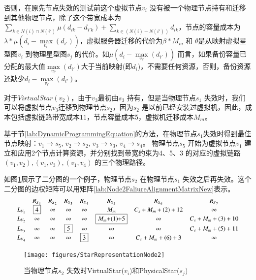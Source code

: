 否则，在原先节点失效的测试前这个虚拟节点$v_i$ 没有被一个物理节点持有和迁移到其他物理节点，除了这个带宽成本为${\sum\limits_{k \in N(i) \cap N(i')} {\mu({d_{ik}} - {d_{i'k}})}  + \sum\limits_{k \in \left( {N(i) - N(i')} \right)} {{d_{ik}}} }$，节点的容量成本为${\lambda * \mu({d_i} - \mathop {\max }\limits_{{v_{i'}}} \left( {{d_{i'}}} \right))}$，虚拟服务器迁移的代价为${\beta * {M_m}}$ 和 $\theta$是从映射虚拟星型图$v_i$ 到物理星型图$s_j$ 的代价。如${\mu({d_i} - \mathop {\max }\limits_{{v_{i'}}} \left( {{d_{i'}}} \right))}$ 而言，如果备份容量已分配的最大值${\mathop {\max }\limits_{{v_{i'}}} \left( {{d_{i'}}} \right)}$大于当前映射(即$d_i$)，不需要任何资源，否则，备份资源还缺少${{d_i} - \mathop {\max }\limits_{{v_{i'}}} \left( {{d_{i'}}} \right)}$。

对于$VirtualStar(v_2)$，由于$v_3$最初由$s_3$ 持有，但是当物理节点$s_1$ 失效时，我们可以将虚拟节点$v_3$迁移到物理节点$s_2$，因为$s_2$ 是以前已经安装过虚拟机，因此，成本包括虚拟链路带宽成本$11$，节点容量成本5，虚拟机迁移成本$M_m$。

基于节\ref{lab:DynamicProgrammingEquation}的方法，在物理节点$s_1$失效时得到最佳节点映射：$v_1 \rightarrow s_5$, $v_2 \rightarrow s_2$, $v_3 \rightarrow s_3$, $v_4 \rightarrow s_4$。 物理节点$s_5$ 开始为虚拟节点$v_1$ 建立和应用2个节点计算资源，并分别找到带宽约束为4、5、3 的对应的虚拟链路$(v_1,v_2),(v_1,v_3),(v_1,v_4)$ 的三个物理路径。

如图\ref{fig:StarRepresentationNode2}展示了二分图的一个例子，物理节点$s_2$ 在物理节点$s_1$ 失效之后再失效。这个二分图的边权矩阵可以用矩阵\ref{lab:Node2FaliureAlignmentMatrixNew}表示。
\begin{equation*}
\small{
 {\begin{array}{*{20}{c}}
&R_{S_{1}}&R_{S_{2}}&R_{S_3}&R_{S_4}&R_{S_5}&R_{S_6}&R_{S_{7}}\\
{L_{V_1}}&\fbox{4}&\infty&\infty&\infty&M_{m}&C_{s}+M_{m}+(2)+12&\infty\\
L_{V_2}&\infty&\infty&\infty&\infty&\fbox{$M_{m}$+(1)+5}&\infty&C_{s}+M_{m}+(3)+10\\
L_{V_3}&\infty&\infty&\fbox{5}&\infty&\infty&\infty&C_{s}+M_{m}+(5)+11\\
L_{V_4}&\infty&\infty&\infty&\fbox{3}&\infty&C_{s}+M_{m}+(6)+3&\infty\\
\end{array}}
}
\label{lab:Node2FaliureAlignmentMatrixNew}
\end{equation*}

\begin{figure}[htbp]
\centering
\texttt{[image: figures/StarRepresentationNode2]}\\
  \caption{当物理节点$s_2$ 失效时VirtualStar($v_i$)和PhysicalStar($s_j$)}\label{fig:StarRepresentationNode2}
\end{figure}

